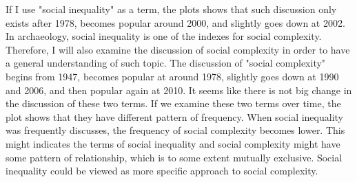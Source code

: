 \documentclass[10pt]{article}
\begin{document}
If I use "social inequality" as a term, the plots shows that such discussion only exists after 1978, becomes popular around 2000, and slightly goes down at 2002. In archaeology, social inequality is one of the indexes for social complexity. Therefore, I will also examine the discussion of social complexity in order to have a general understanding of such topic. The discussion of "social complexity" begins from 1947, becomes popular at around 1978, slightly goes down at 1990 and 2006, and then popular again at 2010. It seems like there is not big change in the discussion of these two terms. If we examine these two terms over time, the plot shows that they have different pattern of frequency. When social inequality was frequently discusses, the frequency of social complexity becomes lower. This might indicates the terms of social inequality and social complexity might have some pattern of relationship, which is to some extent mutually exclusive. Social inequality could be viewed as more specific approach to social complexity. 
\end{document}
